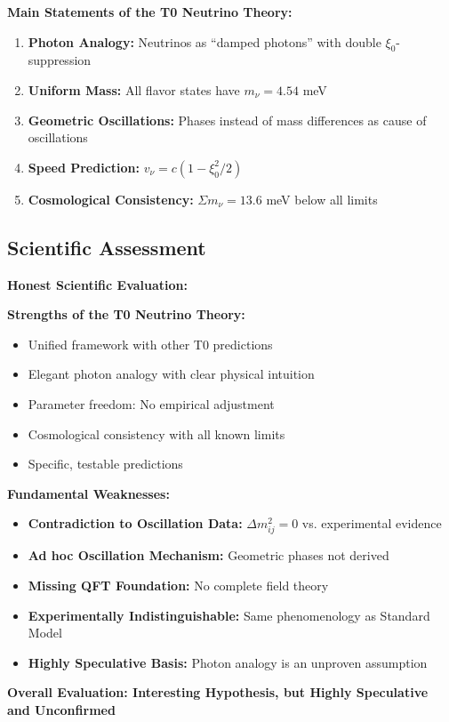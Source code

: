 \documentclass[12pt,a4paper]{article}
\begin{document}
	\begin{keyresult}
		\textbf{Main Statements of the T0 Neutrino Theory:}
		
		\begin{enumerate}
			\item \textbf{Photon Analogy:} Neutrinos as ``damped photons'' with double $\xi_0$-suppression
			
			\item \textbf{Uniform Mass:} All flavor states have $m_\nu = 4.54$ meV
			
			\item \textbf{Geometric Oscillations:} Phases instead of mass differences as cause of oscillations
			
			\item \textbf{Speed Prediction:} $v_\nu = c(1 - \xi_0^2/2)$
			
			\item \textbf{Cosmological Consistency:} $\Sigma m_\nu = 13.6$ meV below all limits
		\end{enumerate}
	\end{keyresult}
	
	\subsection{Scientific Assessment}
	
	\begin{warning}
		\textbf{Honest Scientific Evaluation:}
		
		\textbf{Strengths of the T0 Neutrino Theory:}
		\begin{itemize}
			\item Unified framework with other T0 predictions
			\item Elegant photon analogy with clear physical intuition
			\item Parameter freedom: No empirical adjustment
			\item Cosmological consistency with all known limits
			\item Specific, testable predictions
		\end{itemize}
		
		\textbf{Fundamental Weaknesses:}
		\begin{itemize}
			\item \textbf{Contradiction to Oscillation Data:} $\Delta m^2_{ij} = 0$ vs. experimental evidence
			\item \textbf{Ad hoc Oscillation Mechanism:} Geometric phases not derived
			\item \textbf{Missing QFT Foundation:} No complete field theory
			\item \textbf{Experimentally Indistinguishable:} Same phenomenology as Standard Model
			\item \textbf{Highly Speculative Basis:} Photon analogy is an unproven assumption
		\end{itemize}
		
		\textbf{Overall Evaluation: Interesting Hypothesis, but Highly Speculative and Unconfirmed}
	\end{warning}
	
\end{document}
